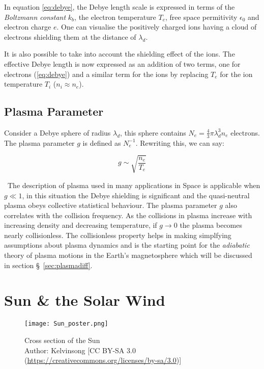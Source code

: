 In equation \ref{eq:debye}, the Debye length scale is expressed in terms of the \emph{Boltzmann constant} $k_b$, 
the electron temperature $T_e$, free space permitivity $\epsilon_0$ and electron charge $e$. One can visualise the 
positively charged ions having a cloud of electrons shielding them at the distance of $\lambda_d$. 

It is also possible to take into account the shielding effect of the ions. The effective Debye length is now 
expressed as an addition of two terms, one for electrons (\ref{eq:debye}) and a similar term for the ions by replacing 
$T_e$ for the ion temperature $T_i$ ($n_i \approx n_e$). 

\subsection*{Plasma Parameter}

Consider a Debye sphere of radius $\lambda_d$, this sphere contains $N_e = \frac{4}{3}\pi \lambda^3_d n_e$ electrons. 
The plasma parameter $g$ is defined as $N_{e}^{-1}$. Rewriting this, we can say:

\begin{equation}
    g \sim \sqrt{\frac{n_e}{T_e}}
\end{equation}

~The description of plasma used in many applications in Space is applicable when $g \ll 1$, in this situation 
the Debye shielding is significant and the quasi-neutral plasma obeys collective statistical behaviour. 
The plasma parameter $g$ also correlates with the collision frequency. As the collisions in plasma increase 
with increasing density and decreasing temperature, if $g \longrightarrow 0$ the plasma becomes nearly collisionless. 
The collisionless property helps in making simplfying assumptions about plasma dynamics and is the starting point 
for the \emph{adiabatic} theory of plasma motions in the Earth's magnetosphere which will be discussed in section 
\S~\ref{sec:plasmadiff}.

\section{Sun \& the Solar Wind}\label{sec:solar}

\begin{figure}
    \noindent\centering\texttt{[image: Sun\_poster.png]}
    \caption{{\small Cross section of the Sun \\ 
    Author: Kelvinsong [CC BY-SA 3.0 (\url{https://creativecommons.org/licenses/by-sa/3.0})]}}
    \label{fig:SunLayers}
\end{figure}

